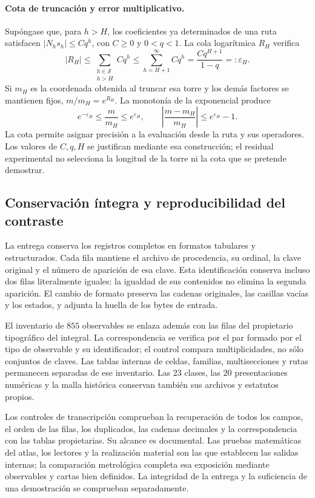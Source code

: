 \paragraph{Cota de truncación y error multiplicativo.}
Supóngase que, para \(h>H\), los coeficientes ya determinados de una
ruta satisfacen \(|N_hs_h|\leq Cq^h\), con \(C\geq0\) y
\(0<q<1\). La cola logarítmica \(R_H\) verifica
\[
 |R_H|\leq\sum_{\substack{h\in\mathcal S\\h>H}}Cq^h
 \leq\sum_{h=H+1}^{\infty}Cq^h
 =\frac{Cq^{H+1}}{1-q}=:\varepsilon_H.
\]
Si \(m_H\) es la coordenada obtenida al truncar esa torre y los demás
factores se mantienen fijos, \(m/m_H=e^{R_H}\). La monotonía de la
exponencial produce
\[
 e^{-\varepsilon_H}\leq\frac{m}{m_H}\leq e^{\varepsilon_H},
 \qquad
 \left|\frac{m-m_H}{m_H}\right|\leq e^{\varepsilon_H}-1.
\]
La cota permite asignar precisión a la evaluación desde la ruta y sus
operadores. Los valores de \(C,q,H\) se justifican mediante esa
construcción; el residual experimental no selecciona la longitud de la
torre ni la cota que se pretende demostrar.

\subsection{Conservación íntegra y reproducibilidad del contraste}
\label{subsec:vi-catalogo-reproducible}

La entrega conserva los registros completos en formatos tabulares y
estructurados. Cada fila mantiene el archivo de procedencia, su ordinal,
la clave original y el número de aparición de esa clave. Esta
identificación conserva incluso dos filas literalmente iguales: la
igualdad de sus contenidos no elimina la segunda aparición. El cambio
de formato preserva las cadenas originales, las casillas vacías y los
estados, y adjunta la huella de los bytes de entrada.

El inventario de \(855\) observables se enlaza además con las filas
del propietario tipográfico del integral. La correspondencia se verifica
por el par formado por el tipo de observable y su identificador; el
control compara multiplicidades, no sólo conjuntos de claves. Las tablas
internas de celdas, familias, multisecciones y rutas permanecen separadas
de ese inventario. Las \(23\) clases, las \(20\) presentaciones
numéricas y la malla histórica conservan también sus archivos y estatutos
propios.

Los controles de transcripción comprueban la recuperación de todos los
campos, el orden de las filas, los duplicados, las cadenas decimales y la
correspondencia con las tablas propietarias. Su alcance es documental.
Las pruebas matemáticas del atlas, los lectores y la realización material
son las que establecen las salidas internas; la comparación metrológica
completa esa exposición mediante observables y cartas bien definidos.
La integridad de la entrega y la suficiencia de una demostración se
comprueban separadamente.

